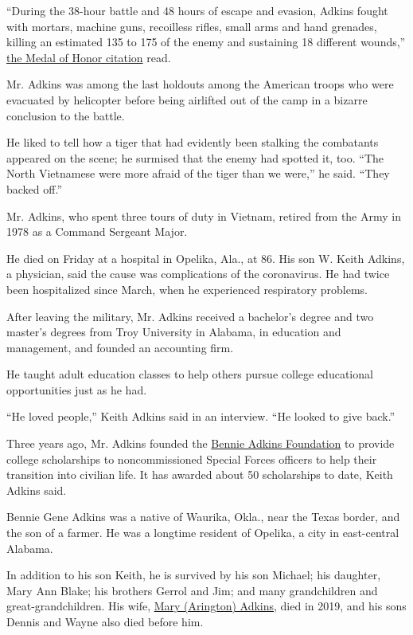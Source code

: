 ``During the 38-hour battle and 48 hours of escape and evasion, Adkins
fought with mortars, machine guns, recoilless rifles, small arms and
hand grenades, killing an estimated 135 to 175 of the enemy and
sustaining 18 different wounds,''
\href{https://www.army.mil/medalofhonor/adkins/}{the Medal of Honor
citation} read.

Mr. Adkins was among the last holdouts among the American troops who
were evacuated by helicopter before being airlifted out of the camp in a
bizarre conclusion to the battle.

He liked to tell how a tiger that had evidently been stalking the
combatants appeared on the scene; he surmised that the enemy had spotted
it, too. ``The North Vietnamese were more afraid of the tiger than we
were,'' he said. ``They backed off.''

Mr. Adkins, who spent three tours of duty in Vietnam, retired from the
Army in 1978 as a Command Sergeant Major.

He died on Friday at a hospital in Opelika, Ala., at 86. His son W.
Keith Adkins, a physician, said the cause was complications of the
coronavirus. He had twice been hospitalized since March, when he
experienced respiratory problems.

After leaving the military, Mr. Adkins received a bachelor's degree and
two master's degrees from Troy University in Alabama, in education and
management, and founded an accounting firm.

He taught adult education classes to help others pursue college
educational opportunities just as he had.

``He loved people,'' Keith Adkins said in an interview. ``He looked to
give back.''

Three years ago, Mr. Adkins founded the
\href{https://www.bennieadkinsfoundation.org/}{Bennie Adkins Foundation}
to provide college scholarships to noncommissioned Special Forces
officers to help their transition into civilian life. It has awarded
about 50 scholarships to date, Keith Adkins said.

Bennie Gene Adkins was a native of Waurika, Okla., near the Texas
border, and the son of a farmer. He was a longtime resident of Opelika,
a city in east-central Alabama.

In addition to his son Keith, he is survived by his son Michael; his
daughter, Mary Ann Blake; his brothers Gerrol and Jim; and many
grandchildren and great-grandchildren. His wife,
\href{https://www.jeffcoattrant.com/notices/MaryN-Adkins}{Mary
(Arington) Adkins}, died in 2019, and his sons Dennis and Wayne also
died before him.

